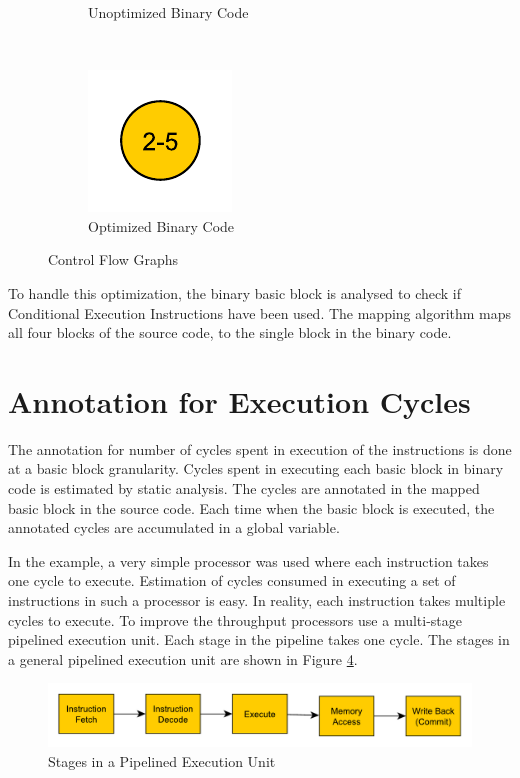 \begin{figure}[h!]
\begin{subfigure}[t]{.33\textwidth}
\caption{Unoptimized Binary Code}
\label{fig:cfgUnopt}
\end{subfigure}%
~
\begin{subfigure}[t]{.33\textwidth}
\centering
\captionsetup{margin=10pt}
\includegraphics[width=.5\textwidth]{figures/CondExecObjOptFlowChart.pdf}
\caption{Optimized Binary Code}
\label{fig:cfgOpt}
\end{subfigure}
\caption{Control Flow Graphs}
\end{figure}

To handle this optimization, the binary basic block is analysed to check if Conditional Execution Instructions have been used. The mapping algorithm maps all four blocks of the source code, to the single block in the binary code. 

\section{Annotation for Execution Cycles}
The annotation for number of cycles spent in execution of the instructions is done at a basic block granularity. Cycles spent in executing each basic block in binary code is estimated by static analysis. The cycles are annotated in the mapped basic block in the source code. Each time when the basic block is executed, the annotated cycles are accumulated in a global variable.

In the example, a very simple processor was used where each instruction takes one cycle to execute. Estimation of cycles consumed in executing a set of instructions in such a processor is easy. In reality, each instruction takes multiple cycles to execute. To improve the throughput processors use a multi-stage pipelined execution unit. Each stage in the pipeline takes one cycle. The stages in a general pipelined execution unit are shown in Figure \ref{fig:genericPipeline}.

\begin{figure}[h]
\centering
\includegraphics[width=\textwidth]{figures/genericPipeline}
\caption{Stages in a Pipelined Execution Unit}
\label{fig:genericPipeline}
\end{figure}

